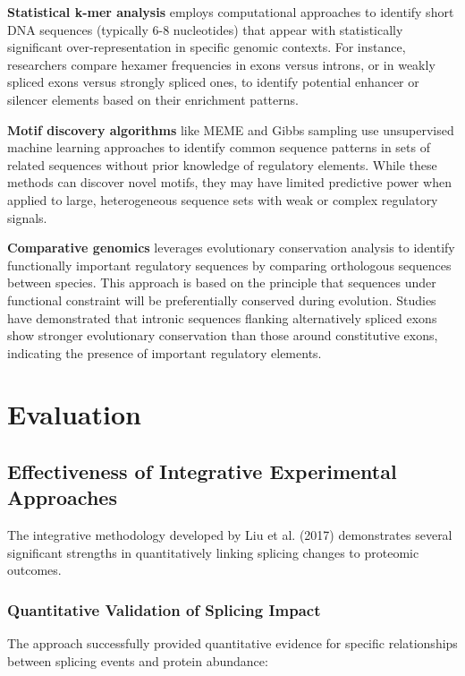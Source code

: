 \documentclass[12pt,a4paper]{article}
\begin{document}
\textbf{Statistical k-mer analysis} employs computational approaches to identify short DNA sequences (typically 6-8 nucleotides) that appear with statistically significant over-representation in specific genomic contexts. For instance, researchers compare hexamer frequencies in exons versus introns, or in weakly spliced exons versus strongly spliced ones, to identify potential enhancer or silencer elements based on their enrichment patterns.

\textbf{Motif discovery algorithms} like MEME and Gibbs sampling use unsupervised machine learning approaches to identify common sequence patterns in sets of related sequences without prior knowledge of regulatory elements. While these methods can discover novel motifs, they may have limited predictive power when applied to large, heterogeneous sequence sets with weak or complex regulatory signals.

\textbf{Comparative genomics} leverages evolutionary conservation analysis to identify functionally important regulatory sequences by comparing orthologous sequences between species. This approach is based on the principle that sequences under functional constraint will be preferentially conserved during evolution. Studies have demonstrated that intronic sequences flanking alternatively spliced exons show stronger evolutionary conservation than those around constitutive exons, indicating the presence of important regulatory elements.

\section{Evaluation}

\subsection{Effectiveness of Integrative Experimental Approaches}

The integrative methodology developed by Liu et al. (2017) demonstrates several significant strengths in quantitatively linking splicing changes to proteomic outcomes.

\subsubsection{Quantitative Validation of Splicing Impact}

The approach successfully provided quantitative evidence for specific relationships between splicing events and protein abundance:
\end{document}
